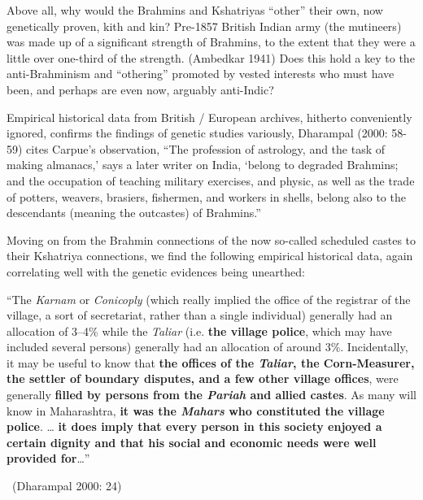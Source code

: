 Above all, why would the Brahmins and Kshatriyas “other” their own, now genetically proven, kith and kin? Pre-1857 British Indian army (the mutineers) was made up of a significant strength of Brahmins, to the extent that they were a little over one-third of the strength. (Ambedkar 1941) Does this hold a key to the anti-Brahminism and “othering” promoted by vested interests who must have been, and perhaps are even now, arguably anti-Indic?

Empirical historical data from British / European archives, hitherto conveniently ignored, confirms the findings of genetic studies variously, Dharampal (2000: 58-59) cites Carpue’s observation, “The profession of astrology, and the task of making almanacs,’ says a later writer on India, ‘belong to degraded Brahmins; and the occupation of teaching military exercises, and physic, as well as the trade of potters, weavers, brasiers, fishermen, and workers in shells, belong also to the descendants (meaning the outcastes) of Brahmins.”

Moving on from the Brahmin connections of the now so-called scheduled castes to their Kshatriya connections, we find the following empirical historical data, again correlating well with the genetic evidences being unearthed:

\begin{myquote}
“The \textit{Karnam} or \textit{Conicoply} (which really implied the office of the registrar of the village, a sort of secretariat, rather than a single individual) generally had an allocation of 3–4\% while the \textit{Taliar} (i.e. \textbf{the village police}, which may have included several persons) generally had an allocation of around 3\%. Incidentally, it may be useful to know that \textbf{the offices of the \textit{Taliar}, the Corn-Measurer, the settler of boundary disputes, and a few other village offices}, were generally \textbf{filled by persons from the \textit{Pariah} and allied castes}. As many will know in Maharashtra, \textbf{it was the \textit{Mahars} who constituted the village police}. … \textbf{it does imply that every person in this society enjoyed a certain dignity and that his social and economic needs were well provided for}…” 

~\hfill (Dharampal 2000: 24)
\end{myquote}

